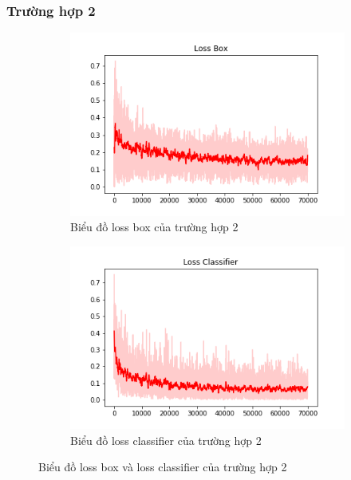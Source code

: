 \subsubsection{Trường hợp 2}
\begin{center}
	\begin{figure}[H]
    \centering
    	\begin{subfigure}[H]{0.5\linewidth}
    		\centering
    		\includegraphics[width=\linewidth]{images/chap3/Loss_Box.png}
		    \caption{Biểu đồ loss box của trường hợp 2}
		    \label{fig:my_label}
		\end{subfigure}\hfill
		\begin{subfigure}[H]{0.5\linewidth}
    		\centering
    		\includegraphics[width=\linewidth]{images/chap3/Loss_Classifier.png}
		    \caption{Biểu đồ loss classifier của trường hợp 2}
		    \label{fig:my_label}
		\end{subfigure}\hfill
	\caption{Biểu đồ loss box và loss classifier của trường hợp 2}
    \label{fig:mylabel}
    \end{figure}


\end{center}
